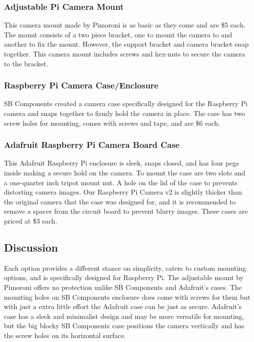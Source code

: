 \documentclass[letterpaper,10pt,serif,draftclsnofoot,onecolumn,compsoc,titlepage]{IEEEtran}
\begin{document}
\subsubsection{Adjustable Pi Camera Mount}

This camera mount made by Pimoroni is as basic as they come and are \$5 each. The mount 
consists of a two piece bracket, one to mount the camera to and another to fix the 
mount. However, the support bracket and camera bracket snap together. This camera 
mount includes screws and hex-nuts to secure the camera to the bracket\cite{AdjCamMt}. \\

\subsubsection{Raspberry Pi Camera Case/Enclosure}

SB Components created a camera case specifically designed for the Raspberry Pi camera 
and snaps together to firmly hold the camera in place. The case has two screw holes for 
mounting, comes with screws and tape, and are \$6 each\cite{BlueCase}. \\

\subsubsection{Adafruit Raspberry Pi Camera Board Case}

This Adafruit Raspberry Pi enclosure is sleek, snaps closed, and has four pegs inside making a 
secure hold on the camera. To mount the case are two slots and a 
one-quarter inch tripot mount nut. A hole on the lid of the case to prevents 
distorting camera images. Our Raspberry Pi Camera v2 is slightly thicker than the 
original camera that the case was designed for, and it is recommended to remove a spacer from 
the circuit board to prevent blurry images. These cases are priced at \$3 each\cite{adafruitCase}.\\

\subsection{Discussion}

Each option provides a different stance on simplicity, caters to custom mounting 
options, and is specifically designed for Raspberry Pi. The adjustable mount 
by Pimoroni offers no protection unlike SB Components and Adafruit's cases. The 
mounting holes on SB Components enclosure does come with screws for them but with 
just a extra little effort the Adafruit case can be just as secure. Adafruit's 
case has a sleek and minimalist design and may be more versatile for mounting, but 
the big blocky SB Components case positions the camera vertically and has the 
screw holes on its horizontal surface. \\
\end{document}
